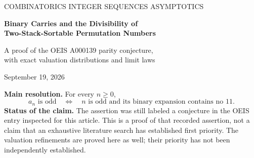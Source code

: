 \documentclass[11pt]{article}
\theoremstyle{definition}\newtheorem{definition}[theorem]{Definition}
\theoremstyle{remark}\newtheorem{remark}[theorem]{Remark}
\newcommand{\F}{\mathbb F}
\newcommand{\ph}{\varphi}
\begin{document}
\begin{center}
{\small\sffamily\color{Accent}COMBINATORICS \quad INTEGER SEQUENCES \quad ASYMPTOTICS}\par\vspace{0.7cm}
{\LARGE\bfseries\color{Ink}Binary Carries and the Divisibility of\\[0.15cm]
Two-Stack-Sortable Permutation Numbers}\par\vspace{0.45cm}
{\large A proof of the OEIS A000139 parity conjecture,\\
with exact valuation distributions and limit laws}\par\vspace{0.5cm}
{September 19, 2026}
\end{center}
\vspace{0.2cm}
\begin{abstract}
For $n\geq 0$, put
\[
 a_n=\frac{2(3n)!}{(n+1)!(2n+1)!},\qquad v(n)=\nu_2(a_n).
\]
The OEIS entry A000139 records a July 2025 conjecture of Peter Bala:
$a_n$ is odd exactly when $n$ is an odd fibbinary number. We prove the
assertion in two independent ways, using binary carries and formal power
series over $\F_2$. More generally, we determine the rational bivariate
generating function of the complete valuation distribution on every
interval $0\leq n<2^m$. It has a cubic denominator, giving a third-order
recurrence in the binary length. For each fixed valuation $r$, the counts
have an explicitly determined minimal eventual recurrence and asymptotics
of order $m^{\lfloor r/2\rfloor}\ph^m$, with explicit constants. We also
classify maximal valuations and find the least positive index of every
valuation. For a uniformly chosen index below $2^m$, we obtain exact mean
and variance formulas, a central limit theorem, and a uniform local limit
theorem. A six-state weighted digit automaton computes the full distribution
below an arbitrary bound without enumerating its indices. The accompanying
Python programs, exact data, and execution records reproduce the finite
checks. The proofs do not depend on those checks.
\end{abstract}

\begin{tcolorbox}[colback=Pale,colframe=Accent,boxrule=0.6pt,arc=1mm]
\textbf{Main resolution.} For every $n\geq0$,
\[
 \boxed{\ a_n\text{ is odd}\quad\Longleftrightarrow\quad
 n\text{ is odd and its binary expansion contains no }11.\ }
\]
\textbf{Status of the claim.} The assertion was still labeled a conjecture
in the OEIS entry inspected for this article. This is a proof of that
recorded assertion, not a claim that an exhaustive literature search has
established first priority. The valuation refinements are proved here as
well; their priority has not been independently established.
\end{tcolorbox}
\newpage
{\small\setlength{\parskip}{0pt}\tableofcontents}
\newpage
\end{document}
